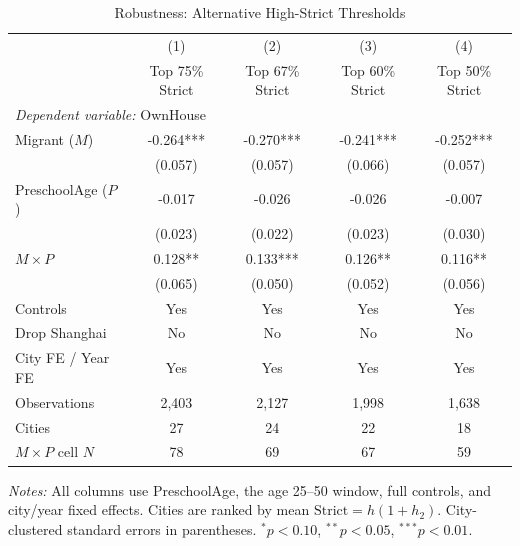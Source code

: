 \begin{table}[htbp]
\centering
\caption{Robustness: Alternative High-Strict Thresholds}
\label{tab:cfps_reg2_A2}
\begin{threeparttable}
\begin{tabular}{lcccc}
\toprule
 & (1) & (2) & (3) & (4) \\
 & Top 75\% Strict & Top 67\% Strict & Top 60\% Strict & Top 50\% Strict \\
\midrule
\multicolumn{5}{l}{\textit{Dependent variable:} OwnHouse} \\
\midrule
Migrant ($M$) & -0.264*** & -0.270*** & -0.241*** & -0.252*** \\
 & (0.057) & (0.057) & (0.066) & (0.057) \\
PreschoolAge ($P$) & -0.017 & -0.026 & -0.026 & -0.007 \\
 & (0.023) & (0.022) & (0.023) & (0.030) \\
$M \times P$ & 0.128** & 0.133*** & 0.126** & 0.116** \\
 & (0.065) & (0.050) & (0.052) & (0.056) \\
\midrule
Controls & Yes & Yes & Yes & Yes \\
Drop Shanghai & No & No & No & No \\
City FE / Year FE & Yes & Yes & Yes & Yes \\
Observations & 2,403 & 2,127 & 1,998 & 1,638 \\
Cities & 27 & 24 & 22 & 18 \\
$M \times P$ cell $N$ & 78 & 69 & 67 & 59 \\
\bottomrule
\end{tabular}
\begin{tablenotes}[flushleft]
\footnotesize
\item \textit{Notes:} All columns use PreschoolAge, the age 25--50 window, full controls, and city/year fixed effects. Cities are ranked by mean $\mathrm{Strict}=h(1+h_2)$. City-clustered standard errors in parentheses. $^{*}p<0.10$, $^{**}p<0.05$, $^{***}p<0.01$.
\end{tablenotes}
\end{threeparttable}
\end{table}
